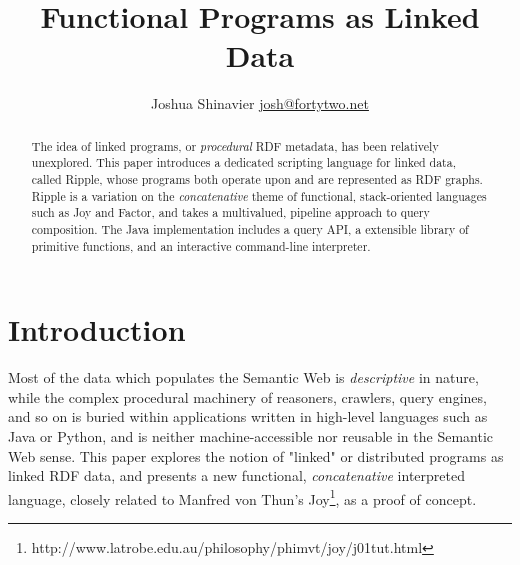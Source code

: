 \documentclass[runningheads]{llncs}
\begin{document}
\mainmatter  %


\title{Functional Programs as Linked Data}


%
%
\author{
Joshua Shinavier
\newline
\url{josh@fortytwo.net}}
%


%
%

\maketitle


\begin{abstract}
The idea of linked programs, or \textit{procedural} RDF metadata, has been relatively unexplored.  This paper introduces a dedicated scripting language for linked data, called Ripple, whose programs both operate upon and are represented as RDF graphs.  Ripple is a variation on the \textit{concatenative} theme of functional, stack-oriented languages such as Joy and Factor, and takes a multivalued, pipeline approach to query composition.  The Java implementation includes a query API, a extensible library of primitive functions, and an interactive command-line interpreter.
\end{abstract}

\section{Introduction}
Most of the data which populates the Semantic Web is \textit{descriptive} in nature, while the complex procedural machinery of reasoners, crawlers, query engines, and so on is buried within applications written in high-level languages such as Java or Python, and is neither machine-accessible nor reusable in the Semantic Web sense.  This paper explores the notion of "linked" or distributed programs as linked RDF data, and presents a new functional, \textit{concatenative} interpreted language, closely related to Manfred von Thun's Joy\footnote{http://www.latrobe.edu.au/philosophy/phimvt/joy/j01tut.html}, as a proof of concept.
\end{document}
